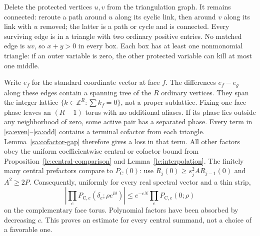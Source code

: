 Delete the protected vertices $u,v$ from the triangulation graph. It remains
connected: reroute a path around $u$ along its cyclic link, then around
$v$ along its link with $u$ removed; the latter is a path or cycle and
is connected. Every surviving edge is in a triangle with two ordinary
positive entries. No matched edge is $uv$, so $x+y>0$ in every box.
Each box has at least one nonmonomial triangle: if an outer variable
is zero, the other protected variable can kill at most one middle.

Write $e_f$ for the standard coordinate vector at face $f$. The differences $e_f-e_g$ along these edges contain a spanning tree
of the $R$ ordinary vertices. They span the integer lattice
$\{k\in\mathbb Z^R:\sum k_f=0\}$, not a proper sublattice. Fixing one
face phase leaves an $(R-1)$-torus with no additional aliases.
If its phase lies outside any neighborhood of zero, some active pair
has a separated phase. Every term in \eqref{sa:even}--\eqref{sa:odd}
contains a terminal cofactor from each triangle. Lemma~\ref{sa:cofactor-gap}
therefore gives a loss in that term. All other factors obey the
uniform coefficientwise central or cofactor bound from
Proposition~\ref{lc:central-comparison} and Lemma~\ref{lc:interpolation}.
The finitely many central
prefactors compare to $P_{\mathrm C}(0)$: use
$R_j(0)\ge s_j^2A R_{j-1}(0)$ and $A^2\ge2P$.
Consequently, uniformly for every real spectral vector and a thin strip,
\begin{equation}\label{sa:global-angular}
 \left|\prod_eP_{\mathrm C,e}(\delta_e;\rho e^{\ii\vartheta})\right|
 \le e^{-cN}\prod_eP_{\mathrm C,e}(0;\rho)
\end{equation}
on the complementary face torus. Polynomial factors have been
absorbed by decreasing $c$. This proves an estimate for every central
summand, not a choice of a favorable one.

